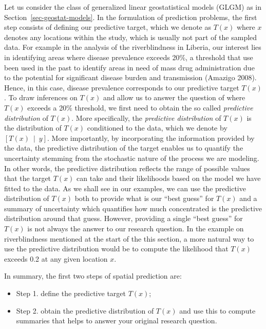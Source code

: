 \documentclass[
  letterpaper,
]{krantz}
\begin{document}
Let us consider the class of generalized linear geostatistical models
(GLGM) as in Section~\ref{sec-geostat-models}. In the formulation of
prediction problems, the first step consists of defining our predictive
target, which we denote as \(T(x)\) where \(x\) denotes any locations
within the study, which is usually not part of the sampled data. For
example in the analysis of the riverblindness in Liberia, our interest
lies in identifying areas where disease prevalence exceeds 20\(\%\), a
threshold that use been used in the past to identify areas in need of
mass drug administration due to the potential for significant disease
burden and transmission (Amazigo 2008). Hence, in this case, disease
prevalence corresponds to our predictive target \(T(x)\). To draw
inferences on \(T(x)\) and allow us to answer the question of where
\(T(x)\) exceeds a 20\(\%\) threshold, we first need to obtain the so
called \emph{predictive distribution} of \(T(x)\). More specifically,
the \emph{predictive distribution} of \(T(x)\) is the distribution of
\(T(x)\) conditioned to the data, which we denote by
\([T(x) \: \mid \: y]\). More importantly, by incorporating the
information provided by the data, the predictive distribution of the
target enables us to quantify the uncertainty stemming from the
stochastic nature of the process we are modeling. In other words, the
predictive distribution reflects the range of possible values that the
target \(T(x)\) can take and their likelihoods based on the model we
have fitted to the data. As we shall see in our examples, we can use the
predictive distribution of \(T(x)\) both to provide what is our ``best
guess'' for \(T(x)\) and a summary of uncertainty which quantifies how
much concentrated is the predictive distribution around that guess.
However, providing a single ``best guess'' for \(T(x)\) is not always
the answer to our research question. In the example on riverblindness
mentioned at the start of the this section, a more natural way to use
the predictive distribution would be to compute the likelihood that
\(T(x)\) exceeds 0.2 at any given location \(x\).

In summary, the first two steps of spatial prediction are:

\begin{itemize}
\item
  Step 1. define the predictive target \(T(x)\);
\item
  Step 2. obtain the predictive distribution of \(T(x)\) and use this to
  compute summaries that helps to answer your original research
  question.
\end{itemize}
\end{document}

